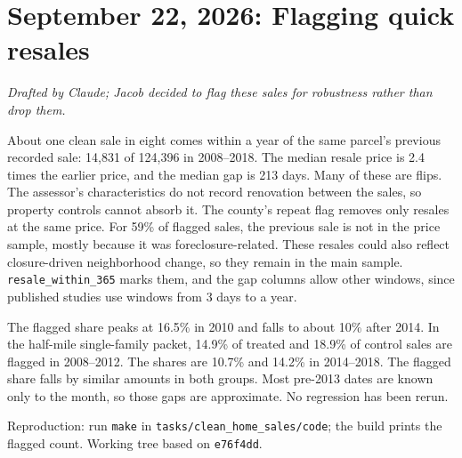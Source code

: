\section*{September 22, 2026: Flagging quick resales}
\textit{Drafted by Claude; Jacob decided to flag these sales for robustness rather than drop them.}

About one clean sale in eight comes within a year of the same parcel's
previous recorded sale: 14,831 of 124,396 in 2008--2018. The median resale price is 2.4 times
the earlier price, and the median gap is 213 days. Many of these are flips.
The assessor's characteristics do not record renovation between the sales, so
property controls cannot absorb it. The county's repeat flag removes only
resales at the same price. For 59\% of flagged sales, the previous sale is not
in the price sample, mostly because it was foreclosure-related. These resales
could also reflect closure-driven neighborhood change, so they remain in the
main sample. \texttt{resale\_within\_365} marks them, and the gap columns allow
other windows, since published studies use windows from 3 days to a year.

The flagged share peaks at 16.5\% in 2010 and falls to about 10\% after 2014.
In the half-mile single-family packet, 14.9\% of treated and 18.9\% of control
sales are flagged in 2008--2012. The shares are 10.7\% and 14.2\% in
2014--2018. The flagged share falls by similar amounts in both groups.
Most pre-2013 dates are known only to the month, so those gaps are approximate. No
regression has been rerun.

\small
Reproduction: run \texttt{make} in \texttt{tasks/clean\_home\_sales/code}; the
build prints the flagged count. Working tree based on \texttt{e76f4dd}.
\normalsize

